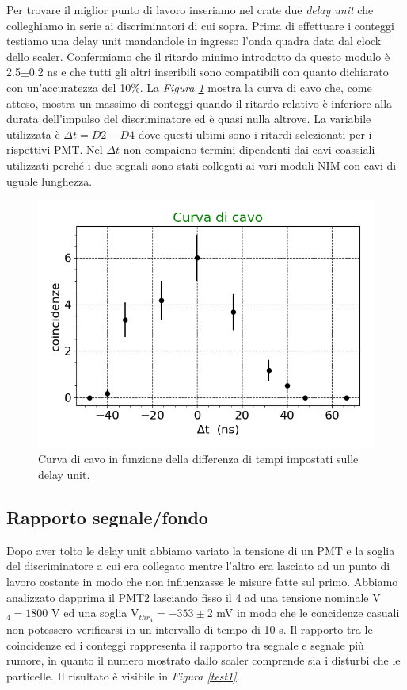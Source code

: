 \documentclass[a4paper]{article}
\begin{document}
Per trovare il miglior punto di lavoro inseriamo nel crate due \emph{delay unit} che colleghiamo in serie ai discriminatori di cui sopra. Prima di effettuare i conteggi testiamo una delay unit mandandole in ingresso l'onda quadra data dal clock dello scaler. Confermiamo che il ritardo minimo introdotto da questo modulo è 2.5$\pm$0.2\! ns e che tutti gli altri inseribili sono compatibili con quanto dichiarato con un'accuratezza del 10\%. La \emph{Figura \ref{curv}} mostra la curva di cavo che, come atteso, mostra un massimo di conteggi quando il ritardo relativo è inferiore alla durata dell'impulso del discriminatore ed è quasi nulla altrove. La variabile utilizzata è $\Delta t=D2-D4$ dove questi ultimi sono i ritardi selezionati per i rispettivi PMT. Nel $\Delta t$ non compaiono termini dipendenti dai cavi coassiali utilizzati perché i due segnali sono stati collegati ai vari moduli NIM con cavi di uguale lunghezza.

\begin{figure}[h]
\centering
\includegraphics[width=8 cm]{curva_cavo}
\caption{Curva di cavo in funzione della differenza di tempi impostati sulle delay unit.}
\label{curv}
\end{figure}



\subsection*{Rapporto segnale/fondo}

Dopo aver tolto le delay unit abbiamo variato la tensione di un PMT  e la soglia del discriminatore a cui era collegato mentre l'altro era lasciato ad un punto di lavoro costante in modo che non influenzasse le misure fatte sul primo. Abbiamo analizzato dapprima il PMT2 lasciando fisso il 4 ad una tensione nominale V$_4=1800$\! V ed una soglia V$_{thr_4}=-353\pm2$\! mV in modo che le concidenze casuali non potessero verificarsi in un intervallo di tempo di 10\! s. 
Il rapporto tra le coincidenze ed i conteggi rappresenta il rapporto tra segnale e segnale più rumore, in quanto il numero mostrato dallo scaler comprende sia i disturbi che le particelle. Il risultato è visibile in \emph{Figura \ref{test1}}.
\end{document}
